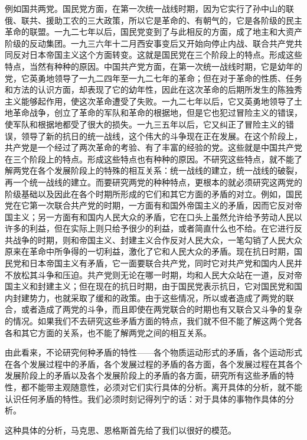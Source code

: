 \documentclass[UTF8, 12pt, a4paper]{ctexrep}
\begin{document}
例如国共两党。国民党方面，在第一次统一战线时期，因为它实行了孙中山的联俄、联共、援助工农的三大政策，所以它是革命的、有朝气的，它是各阶级的民主革命的联盟。一九二七年以后，国民党变到了与此相反的方面，成了地主和大资产阶级的反动集团。一九三六年十二月西安事变后又开始向停止内战、联合共产党共同反对日本帝国主义这个方面转变。这就是国民党在三个阶段上的特点。形成这些特点，当然有种种的原因。中国共产党方面，在第一次统一战线时期，它是幼年的党，它英勇地领导了一九二四年至一九二七年的革命；但在对于革命的性质、任务和方法的认识方面，却表现了它的幼年性，因此在这次革命的后期所发生的陈独秀主义能够起作用，使这次革命遭受了失败。一九二七年以后，它又英勇地领导了土地革命战争，创立了革命的军队和革命的根据地，但是它也犯过冒险主义的错误，使军队和根据地都受了很大的损失。一九三五年以后，它又纠正了冒险主义的错误，领导了新的抗日的统一战线，这个伟大的斗争现在正在发展。在这个阶段上，共产党是一个经过了两次革命的考验、有了丰富的经验的党。这些就是中国共产党在三个阶段上的特点。形成这些特点也有种种的原因。不研究这些特点，就不能了解两党在各个发展阶段上的特殊的相互关系：统一战线的建立，统一战线的破裂，再一个统一战线的建立。而要研究两党的种种特点，更根本的就必须研究这两党的阶级基础以及因此在各个时期所形成的它们和其它方面的矛盾的对立。例如，国民党在它第一次联合共产党的时期，一方面有和国外帝国主义的矛盾，因而它反对帝国主义；另一方面有和国内人民大众的矛盾，它在口头上虽然允许给予劳动人民以许多的利益，但在实际上则只给予很少的利益，或者简直什么也不给。在它进行反共战争的时期，则和帝国主义、封建主义合作反对人民大众，一笔勾销了人民大众原来在革命中所争得的一切利益，激化了它和人民大众的矛盾。现在抗日时期，国民党和日本帝国主义有矛盾，它一面要联合共产党，同时它对共产党和国内人民并不放松其斗争和压迫。共产党则无论在哪一时期，均和人民大众站在一道，反对帝国主义和封建主义；但在现在的抗日时期，由于国民党表示抗日，它对国民党和国内封建势力，也就采取了缓和的政策。由于这些情况，所以或者造成了两党的联合，或者造成了两党的斗争，而且即使在两党联合的时期也有又联合又斗争的复杂的情况。如果我们不去研究这些矛盾方面的特点，我们就不但不能了解这两个党各各和其它方面的关系，也不能了解两党之间的相互关系。

由此看来，不论研究何种矛盾的特性——各个物质运动形式的矛盾，各个运动形式在各个发展过程中的矛盾，各个发展过程的矛盾的各方面，各个发展过程在其各个发展阶段上的矛盾以及各个发展阶段上的矛盾的各方面，研究所有这些矛盾的特性，都不能带主观随意性，必须对它们实行具体的分析。离开具体的分析，就不能认识任何矛盾的特性。我们必须时刻记得列宁的话：对于具体的事物作具体的分析。

这种具体的分析，马克思、恩格斯首先给了我们以很好的模范。
\end{document}
